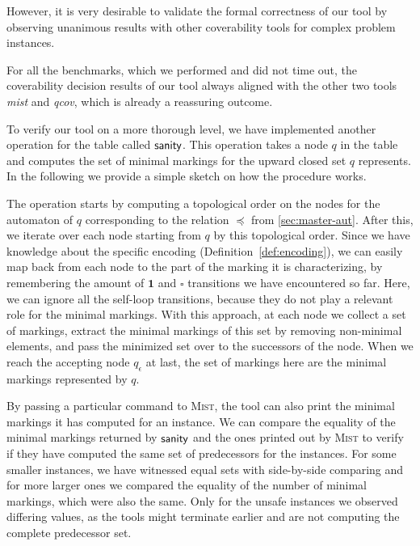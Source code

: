 However, it is very desirable to validate the formal correctness of our tool by observing unanimous results with other coverability tools for complex problem instances.

For all the benchmarks, which we performed and did not time out, the coverability decision results of our tool always aligned with the other two tools \textit{mist} and \textit{qcov}, which is already a reassuring outcome. 

To verify our tool on a more thorough level, we have implemented another operation for the table called $\operatorname{\textsf{sanity}}$. This operation takes a node $q$ in the table and computes the set of minimal markings for the upward closed set $q$ represents. In the following we provide a simple sketch on how the procedure works.

The operation starts by computing a topological order on the nodes for the automaton of $q$ corresponding to the relation $\preceq$ from \autoref{sec:master-aut}. After this, we iterate over each node starting from $q$ by this topological order. Since we have knowledge about the specific encoding (Definition~\autoref{def:encoding}), we can easily map back from each node to the part of the marking it is characterizing, by remembering the amount of $\bm{1}$ and $\square$ transitions we have encountered so far. Here, we can ignore all the self-loop transitions, because they do not play a relevant role for the minimal markings.
With this approach, at each node we collect a set of markings, extract the minimal markings of this set by removing non-minimal elements, and pass the minimized set over to the successors of the node. When we reach the accepting node $q_{\epsilon}$ at last, the set of markings here are the minimal markings represented by $q$.

By passing a particular command to \textsc{Mist}, the tool can also print the minimal markings it has computed for an instance. We can compare the equality of the minimal markings returned by $\operatorname{\textsf{sanity}}$ and the ones printed out by \textsc{Mist} to verify if they have computed the same set of predecessors for the instances. For some smaller instances, we have witnessed equal sets with side-by-side comparing and for more larger ones we compared the equality of the number of minimal markings, which were also the same. Only for the unsafe instances we observed differing values, as the tools might terminate earlier and are not computing the complete predecessor set.